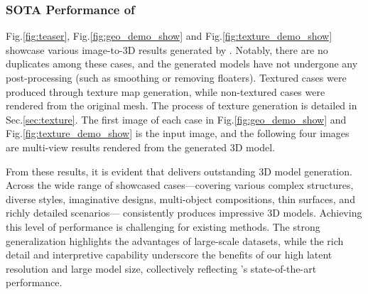 \subsubsection{SOTA Performance of \method{}}
Fig.\ref{fig:teaser}, Fig.\ref{fig:geo_demo_show} and Fig.\ref{fig:texture_demo_show} showcase various image-to-3D results generated by \method{}. Notably, there are no duplicates among these cases, and the generated models have not undergone any post-processing (such as smoothing or removing floaters). Textured cases were produced through texture map generation, while non-textured cases were rendered from the original mesh. The process of texture generation is detailed in Sec.\ref{sec:texture}. The first image of each case in Fig.\ref{fig:geo_demo_show} and Fig.\ref{fig:texture_demo_show} is the input image, and the following four images are multi-view results rendered from the generated 3D model.

From these results, it is evident that \method{} delivers outstanding 3D model generation. Across the wide range of showcased cases—covering various complex structures, diverse styles, imaginative designs, multi-object compositions, thin surfaces, and richly detailed scenarios—\method{} consistently produces impressive 3D models. Achieving this level of performance is challenging for existing methods. The strong generalization highlights the advantages of large-scale datasets, while the rich detail and interpretive capability underscore the benefits of our high latent resolution and large model size, collectively reflecting \method{}’s state-of-the-art performance.

